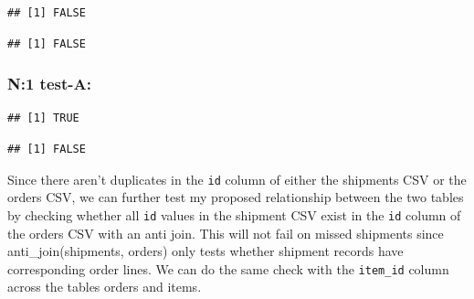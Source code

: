 \documentclass[
]{article}
\newenvironment{Shaded}{\begin{snugshade}}{\end{snugshade}}
\newcommand{\CommentTok}[1]{\textcolor[rgb]{0.56,0.35,0.01}{\textit{#1}}}
\newcommand{\FunctionTok}[1]{\textcolor[rgb]{0.13,0.29,0.53}{\textbf{#1}}}
\newcommand{\NormalTok}[1]{#1}
\newcommand{\SpecialCharTok}[1]{\textcolor[rgb]{0.81,0.36,0.00}{\textbf{#1}}}
\begin{document}
\begin{verbatim}
## [1] FALSE
\end{verbatim}

\begin{Shaded}
\end{Shaded}

\begin{verbatim}
## [1] FALSE
\end{verbatim}

\subsubsection{N:1 test-A:}\label{n1-test-a}

\begin{Shaded}
\end{Shaded}

\begin{verbatim}
## [1] TRUE
\end{verbatim}

\begin{Shaded}
\end{Shaded}

\begin{verbatim}
## [1] FALSE
\end{verbatim}

Since there aren't duplicates in the \texttt{id} column of either the
shipments CSV or the orders CSV, we can further test my proposed
relationship between the two tables by checking whether all \texttt{id}
values in the shipment CSV exist in the \texttt{id} column of the orders
CSV with an anti join. This will not fail on missed shipments since
anti\_join(shipments, orders) only tests whether shipment records have
corresponding order lines. We can do the same check with the
\texttt{item\_id} column across the tables orders and items.
\end{document}
